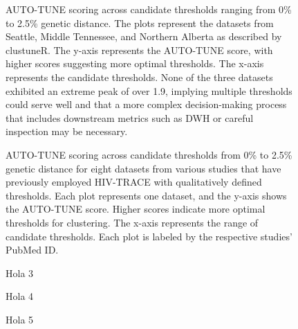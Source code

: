 \documentclass[utf8]{FrontiersinHarvard} %
\begin{document}
\begin{figure}[h!]
\caption{ AUTO-TUNE scoring across candidate thresholds ranging from 0\% to
  2.5\% genetic distance. The plots represent the datasets from Seattle, Middle
  Tennessee, and Northern Alberta as described by clustuneR. The y-axis
  represents the AUTO-TUNE score, with higher scores suggesting more optimal
  thresholds. The x-axis represents the candidate thresholds. None of the three
  datasets exhibited an extreme peak of over 1.9, implying multiple thresholds
  could serve well and that a more complex decision-making process that
  includes downstream metrics such as DWH or careful inspection may be
  necessary.}\label{fig:clustuner}
\end{figure}

\begin{figure}[h!]
\caption{ AUTO-TUNE scoring across candidate thresholds from 0\% to 2.5\%
  genetic distance for eight datasets from various studies that have previously
  employed HIV-TRACE with qualitatively defined thresholds. Each plot
  represents one dataset, and the y-axis shows the AUTO-TUNE score. Higher
  scores indicate more optimal thresholds for clustering. The x-axis represents
  the range of candidate thresholds. Each plot is labeled by the respective
  studies' PubMed ID. }\label{fig:paperComparison} \end{figure}

\begin{figure}[h!]
\caption{ Hola 3 }\label{fig:chinaScorePlot}
\end{figure}

\begin{figure}[h!]
\caption{ Hola 4 }\label{fig:scoreAbove2}
\end{figure}

\begin{figure}[h!]
\caption{ Hola 5 }\label{fig:subsampling}
\end{figure}
\end{document}
